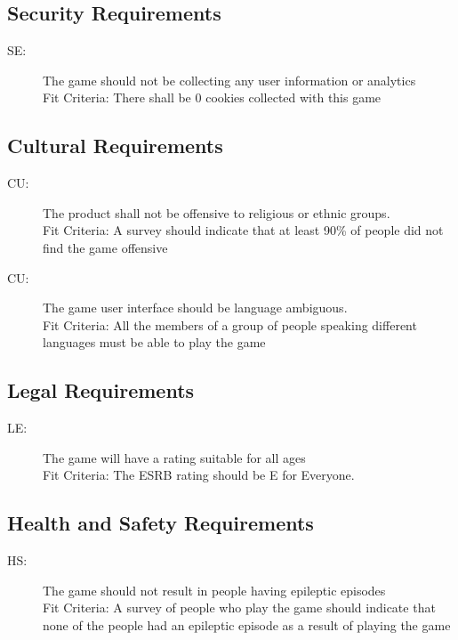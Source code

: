 \documentclass[12pt, titlepage]{article}
\newcounter{secreq}
\newcommand{\sethesecreq}{SE\thesecreq}
\newcounter{culreq}
\newcommand{\cultheculreq}{CU\theculreq}
\newcounter{legreq}
\newcommand{\legthelegreq}{LE\thelegreq}
\newcounter{hsreq}
\newcommand{\hsthehsreq}{HS\thehsreq}
\begin{document}
\subsection{Security Requirements}
\begin{description}
\item [ \sethesecreq:] The game should not be collecting any user information or analytics\\ Fit Criteria: There shall be 0 cookies collected with this game
\end{description}

\subsection{Cultural Requirements}
\begin{description}
\item [ \cultheculreq:] The product shall not be offensive to religious or ethnic groups. \\
Fit Criteria: A survey should indicate that at least 90\% of people did not find the game offensive
\item [ \cultheculreq:] The game user interface should be language ambiguous.\\
Fit Criteria: All the members of a group of people speaking different languages must be able to play the game
\end{description}

\subsection{Legal Requirements}
\begin{description}
\item [ \legthelegreq:] The game will have a rating suitable for all ages\\
Fit Criteria: The ESRB rating should be E for Everyone.
\end{description}

\subsection{Health and Safety Requirements}
\begin{description}
\item [ \hsthehsreq:] The game should not result in people having epileptic episodes\\
Fit Criteria: A survey of people who play the game should indicate that none of the people had an epileptic episode as a result of playing the game
\end{description}
\end{document}
